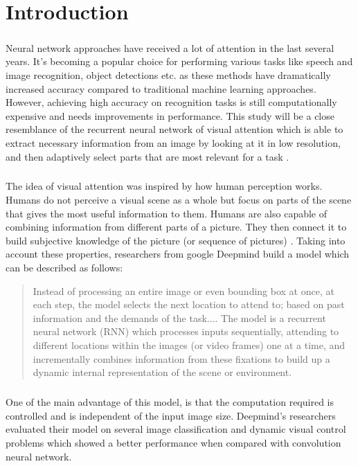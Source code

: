 \chapter{Introduction}
\label{chap:intro}
\paragraph{} Neural network approaches have received a lot of attention in the last several years.
It's becoming a popular choice for performing various tasks like speech and image recognition,
object detections etc. as these methods have dramatically increased accuracy
compared to traditional machine learning approaches.
However, achieving high accuracy on recognition tasks is still computationally
expensive and needs improvements in performance.
This study will be a close resemblance of the recurrent neural network of visual attention which is able to extract necessary
information from an image by looking at it in low resolution, and then
adaptively select parts that are most relevant for a task \cite{DBLP:journals/corr/MnihHGK14}.

 \paragraph{} The idea of visual attention was inspired by how human perception works.
 Humans do not perceive a visual scene as a whole but focus on parts of
 the scene that gives the most useful information to them.
 Humans are also capable of combining information from different parts of a picture.
 They then connect it to build subjective knowledge of the picture (or sequence of pictures) \cite{Goldsborough}.
Taking into account these properties, researchers from google
Deepmind build a model which can be described as follows:
 \blockquote{
 	Instead of processing an entire image or even bounding box at once,
 	at each step, the model selects the next location to attend to;
	based on past information and the demands of the task....
	The model is a recurrent neural network (RNN) which processes
	inputs sequentially, attending to different locations within the
	images (or video frames) one at a time, and incrementally combines
	information from these fixations to build up a dynamic internal
	representation of the scene or environment.\cite{DBLP:journals/corr/MnihHGK14}
}

 \paragraph{} One of the main advantage of this model, is that the computation required is
 controlled and is independent of the input image size.
 Deepmind’s researchers evaluated their model on several image classification
 and dynamic visual control problems which showed a better performance when
 compared with convolution neural network\cite{Goldsborough}.

